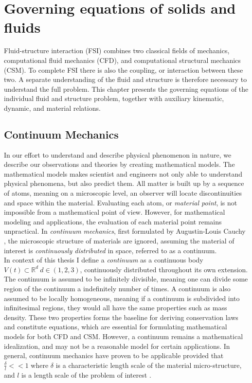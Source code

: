 \chapter{Governing equations of solids and fluids}
Fluid-structure interaction (FSI) combines two classical fields of mechanics, computational fluid mechanics (CFD), and computational structural mechanics (CSM). To complete FSI there is also the coupling, or interaction between these two. A separate understanding of the fluid and structure is therefore necessary to understand the full problem. This chapter presents the governing equations of the individual fluid and structure problem, together with auxiliary kinematic, dynamic, and material relations.

\section{Continuum Mechanics}
In our effort to understand and describe physical phenomenon in nature, we describe our observations and theories by creating mathematical models. The mathematical models makes scientist and engineers not only able to understand physical phenomena, but also predict them.  All matter is built up by a sequence of atoms, meaning on a microscopic level, an observer will locate discontinuities and space within the material. Evaluating each atom, or \textit{material point}, is not impossible from a mathematical point of view. However, for mathematical modeling and applications, the evaluation of each material point remains unpractical. In \textit{continuum mechanics}, first formulated by Augustin-Louis Cauchy \cite{Merodio2011}, the microscopic structure of materials are ignored,  assuming the material of interest is \textit{continuously distributed} in space, referred to as a continuum. \\
In context of this thesis I define a \textit{continuum} as a continuous body $V(t) \subset \mathbb{R}^d \ d \in (1, 2, 3)$,  continuously distributed throughout its own extension. The continuum is assumed to be infinitely divisible, meaning one can divide some region of the continuum a indefinitely number of times. A continuum is also assumed to be locally homogeneous, meaning if a continuum is subdivided into infinitesimal regions, they would all have the same properties such as mass density. These two properties forms the baseline for deriving conservation laws and constitute equations, which are essential for formulating mathematical models for both CFD and CSM. However, a continuum remains a mathematical idealization, and may not be a reasonable model for certain applications. In general, continuum mechanics have proven to be applicable provided that $\frac{\delta}{l} << 1$ where $\delta$ is a characteristic length scale of the material micro-structure, and $l$ is a length scale of the problem of interest \cite{Humphrey2002}.

